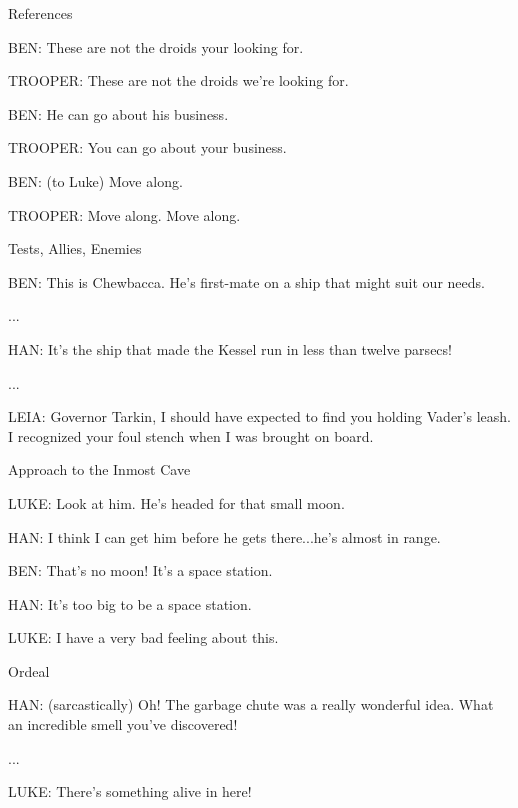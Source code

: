 \documentclass[a4paper,azure,pdf,colorBG,slideColor]{prosper}
\newcommand{\ns}[1]{\vfill \end{slide}\begin{slide}{#1}}
\newcommand{\bs}{\bigskip}
\newcommand{\ms}{\medskip}
\begin{document}
\begin{slide}{References}
{\ms

BEN: These are not the droids your looking for.

\ms

TROOPER: These are not the droids we're looking for.

\ms

BEN: He can go about his business.

\ms

TROOPER: You can go about your business.

\ms

BEN: (to Luke) Move along.

\ms

TROOPER: Move along. Move along.
}

\ns{Tests, Allies, Enemies}

\bs

BEN: This is Chewbacca. He's first-mate on a ship that might suit our
needs.

...

\bs

HAN: It's the ship that made the Kessel run in less than twelve
parsecs!

...

\bs


LEIA: Governor Tarkin, I should have expected to find you holding
Vader's leash. I recognized your foul stench when I was brought on
board.



\ns{Approach to the Inmost Cave}

LUKE: Look at him. He's headed for that small moon.

\bs

HAN: I think I can get him before he gets there...he's almost in
range.

\bs

BEN: That's no moon! It's a space station.

\bs

HAN: It's too big to be a space station.

\bs

LUKE: I have a very bad feeling about this.

\ns{Ordeal}

HAN: (sarcastically) Oh! The garbage chute was a really wonderful
idea. What an incredible smell you've discovered! 

...

\bs

LUKE: There's something alive in here!

\bs


\end{slide}
\end{document}
